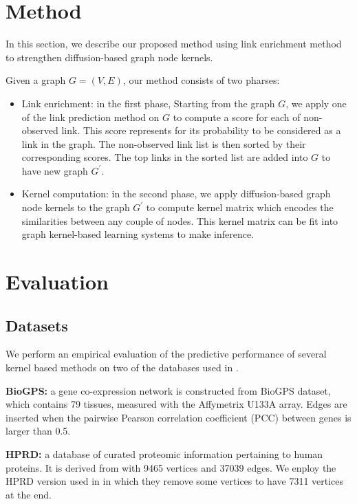 \documentclass[runningheads,a4paper]{llncs}
\begin{document}
\section{Method}
\label{method}
In this section, we describe our proposed method using link enrichment method to strengthen diffusion-based graph node kernels.

Given a graph $G=(V, E)$, our method consists of two pharses:
\begin{itemize}
\item Link enrichment: in the first phase, Starting from the graph $G$, we apply one of the link prediction method on $G$ to compute a score for each of non-observed link. This score represents for its probability to be considered as a link in the graph. The non-observed link list is then sorted by their corresponding scores. The top links in the sorted list are added into $G$ to have new graph $G^{'}$.
\item Kernel computation: in the second phase, we apply diffusion-based graph node kernels to the graph $G^{'}$ to compute kernel matrix which encodes the similarities between any couple of nodes. This kernel matrix can be fit into graph kernel-based learning systems to make inference.
\end{itemize}
\section{Evaluation}
\label{evaluation}
\subsection{Datasets}
We perform an empirical evaluation of the predictive performance of several kernel based methods on two of the databases used in \cite{medk}.

\textbf{BioGPS:} a gene co-expression network is constructed from BioGPS dataset, which contains 79 tissues, measured with the Affymetrix U133A array. Edges are inserted when the pairwise Pearson correlation coefficient (PCC) between genes is larger than 0.5.

\textbf{HPRD:} a database of curated proteomic information pertaining to human proteins. It is derived from \cite{hprd} with 9465 vertices and 37039 edges. We enploy the HPRD version used in \cite{medk} in which they remove some vertices to have 7311 vertices at the end.
\end{document}

